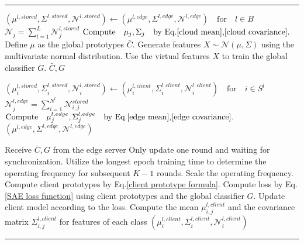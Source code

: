 \documentclass[journal]{IEEEtran}
\makeatletter
\newenvironment{breakablealgorithm}
  {%
   \begin{center}
     \refstepcounter{algorithm}%
     \hrule height.8pt depth0pt \kern2pt%
     \renewcommand{\caption}[2][\relax]{%
       {\raggedright\textbf{\ALG@name~\thealgorithm} ##2\par}%
       \ifx\relax##1\relax %
         \addcontentsline{loa}{algorithm}{\protect\numberline{\thealgorithm}##2}%
       \else %
         \addcontentsline{loa}{algorithm}{\protect\numberline{\thealgorithm}##1}%
       \fi
       \kern2pt\hrule\kern2pt
     }
  }{%
     \kern2pt\hrule\relax%
   \end{center}
  }
\makeatother
\begin{document}
\begin{breakablealgorithm}
\begin{algorithmic}[1]
    \State \( (\mu^{l,stored}, \Sigma^{l,stored},\mathcal{N}^{l,stored}) \gets (\mu^{l,edge}, \Sigma^{l,edge},\mathcal{N}^{l,edge})\quad\text{for}\quad l \in B \)
    \State \( \mathcal{N}_j = \sum_{l=1}^{L}\mathcal{N}^{l,stored}_{j} \)
    \State \( \text{Compute}\quad\mu_j,\Sigma_j\quad\text{by Eq.\ref{cloud mean},\ref{cloud covariance}}.  \)
    \EndFor
    \State Define $\mu$ as the global prototypes $\bar{C}$.
    \State Generate features \(X \sim \mathcal{N}(\mu, \Sigma)\) using the multivariate normal distribution.
    \State Use the virtual features \(X\) to train the global classifier \( G \).
    \State \Return \( \bar{C}, G \)
    \EndProcedure
    
    \State \( (\mu^{l,stored}_i, \Sigma^{l,stored}_i,\mathcal{N}^{l,stored}_i) \gets (\mu^{l,client}_i, \Sigma^{l,client}_i,\mathcal{N}^{l,client}_i)\quad\text{for}\quad i \in S^l \)
    \State \( \mathcal{N}^{l,edge}_j = \sum_{i=1}^{N^l}\mathcal{N}^{stored}_{i,j} \)
    \State \( \text{Compute}\quad\mu^{l,edge}_j,\Sigma^{l,edge}_j\quad\text{by Eq.\ref{edge mean},\ref{edge covariance}}.  \)
    \EndFor
    \State \Return \( (\mu^{l,edge}, \Sigma^{l,edge},\mathcal{N}^{l,edge}) \)
    \EndProcedure

    \State Receive \( \bar{C}, G \) from the edge server
    \State Only update one round and waiting for synchronization.
    \State Utilize the longest epoch training time to determine the operating frequency for subsequent $K-1$ rounds.
    \State Scale the operating frequency.
    \State Compute client prototypes by Eq.\ref{client prototype formula}.
    \State Compute loss by Eq.\ref{SAE loss function} using client prototypes and the global classifier $G$.
    \State Update client model according to the loss.
    \EndFor
    \EndFor
    \State Compute the mean $\mu^{l,client}_{i,j}$ and the covariance matrix  $\Sigma^{l,client}_{i,j}$ for features of each class 
    \State \Return \( (\mu^{l,client}_i, \Sigma^{l,client}_i,\mathcal{N}^{l,client}_i) \)
    \EndProcedure
  \end{algorithmic}
\end{breakablealgorithm}
\end{document}
